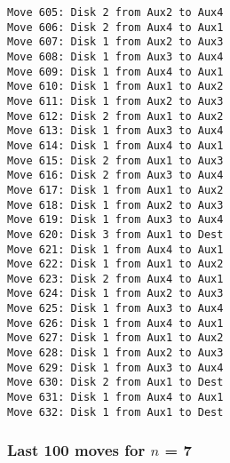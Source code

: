 \documentclass[11pt]{article}
\begin{document}
\begin{multicols}{2}
\begin{Verbatim}[fontsize=\small]
Move 605: Disk 2 from Aux2 to Aux4
Move 606: Disk 2 from Aux4 to Aux1
Move 607: Disk 1 from Aux2 to Aux3
Move 608: Disk 1 from Aux3 to Aux4
Move 609: Disk 1 from Aux4 to Aux1
Move 610: Disk 1 from Aux1 to Aux2
Move 611: Disk 1 from Aux2 to Aux3
Move 612: Disk 2 from Aux1 to Aux2
Move 613: Disk 1 from Aux3 to Aux4
Move 614: Disk 1 from Aux4 to Aux1
Move 615: Disk 2 from Aux1 to Aux3
Move 616: Disk 2 from Aux3 to Aux4
Move 617: Disk 1 from Aux1 to Aux2
Move 618: Disk 1 from Aux2 to Aux3
Move 619: Disk 1 from Aux3 to Aux4
Move 620: Disk 3 from Aux1 to Dest
Move 621: Disk 1 from Aux4 to Aux1
Move 622: Disk 1 from Aux1 to Aux2
Move 623: Disk 2 from Aux4 to Aux1
Move 624: Disk 1 from Aux2 to Aux3
Move 625: Disk 1 from Aux3 to Aux4
Move 626: Disk 1 from Aux4 to Aux1
Move 627: Disk 1 from Aux1 to Aux2
Move 628: Disk 1 from Aux2 to Aux3
Move 629: Disk 1 from Aux3 to Aux4
Move 630: Disk 2 from Aux1 to Dest
Move 631: Disk 1 from Aux4 to Aux1
Move 632: Disk 1 from Aux1 to Dest
\end{Verbatim}

\subsubsection*{Last 100 moves for $n$ = 7}


\end{multicols}
\end{document}

